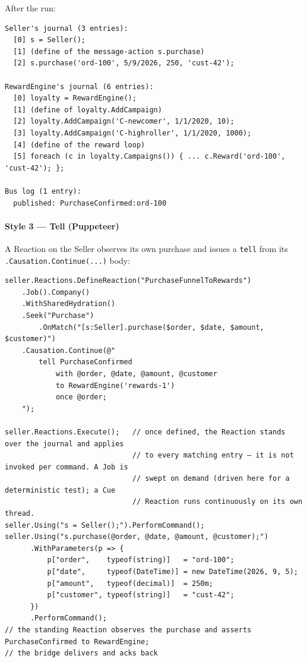 \documentclass[
]{article}
\let\origtexttt\texttt%
\renewcommand{\texttt}[1]{\origtexttt{\seqsplit{#1}}}%
\let\texttt\origtexttt%
\begin{document}
After the run:

\begin{verbatim}
Seller's journal (3 entries):
  [0] s = Seller();
  [1] (define of the message-action s.purchase)
  [2] s.purchase('ord-100', 5/9/2026, 250, 'cust-42');

RewardEngine's journal (6 entries):
  [0] loyalty = RewardEngine();
  [1] (define of loyalty.AddCampaign)
  [2] loyalty.AddCampaign('C-newcomer', 1/1/2020, 10);
  [3] loyalty.AddCampaign('C-highroller', 1/1/2020, 1000);
  [4] (define of the reward loop)
  [5] foreach (c in loyalty.Campaigns()) { ... c.Reward('ord-100', 'cust-42'); };

Bus log (1 entry):
  published: PurchaseConfirmed:ord-100
\end{verbatim}

\paragraph{Style 3 --- Tell (Puppeteer)}\label{style-3-tell-puppeteer}

A Reaction on the Seller observes its own purchase and issues a
\texttt{tell} from its \texttt{.Causation.Continue(...)} body:

\begin{verbatim}
seller.Reactions.DefineReaction("PurchaseFunnelToRewards")
    .Job().Company()
    .WithSharedHydration()
    .Seek("Purchase")
        .OnMatch("[s:Seller].purchase($order, $date, $amount, $customer)")
    .Causation.Continue(@"
        tell PurchaseConfirmed
            with @order, @date, @amount, @customer
            to RewardEngine('rewards-1')
            once @order;
    ");

seller.Reactions.Execute();   // once defined, the Reaction stands over the journal and applies
                              // to every matching entry — it is not invoked per command. A Job is
                              // swept on demand (driven here for a deterministic test); a Cue
                              // Reaction runs continuously on its own thread.
seller.Using("s = Seller();").PerformCommand();
seller.Using("s.purchase(@order, @date, @amount, @customer);")
      .WithParameters(p => {
          p["order",    typeof(string)]   = "ord-100";
          p["date",     typeof(DateTime)] = new DateTime(2026, 9, 5);
          p["amount",   typeof(decimal)]  = 250m;
          p["customer", typeof(string)]   = "cust-42";
      })
      .PerformCommand();
// the standing Reaction observes the purchase and asserts PurchaseConfirmed to RewardEngine;
// the bridge delivers and acks back
\end{verbatim}
\end{document}
